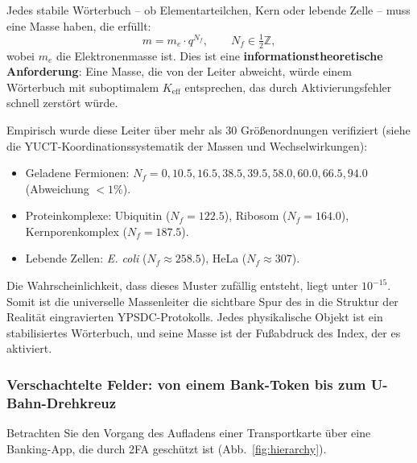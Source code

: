 \documentclass[12pt,a4paper]{article}
\theoremstyle{remark}
\begin{document}
	Jedes stabile Wörterbuch – ob Elementarteilchen, Kern oder lebende Zelle – muss eine Masse haben, die erfüllt:
	\[
	m = m_e \cdot q^{N_f}, \qquad N_f \in \tfrac{1}{2}\mathbb{Z},
	\]
	wobei \(m_e\) die Elektronenmasse ist. Dies ist eine \textbf{informationstheoretische Anforderung}: Eine Masse, die von der Leiter abweicht, würde einem Wörterbuch mit suboptimalem \(K_{\mathrm{eff}}\) entsprechen, das durch Aktivierungsfehler schnell zerstört würde.
	
	Empirisch wurde diese Leiter über mehr als 30 Größenordnungen verifiziert (siehe die YUCT-Koordinationssystematik der Massen und Wechselwirkungen):
	\begin{itemize}
		\item Geladene Fermionen: \(N_f = 0, 10.5, 16.5, 38.5, 39.5, 58.0, 60.0, 66.5, 94.0\) (Abweichung \(< 1\%\)).
		\item Proteinkomplexe: Ubiquitin (\(N_f = 122.5\)), Ribosom (\(N_f = 164.0\)), Kernporenkomplex (\(N_f = 187.5\)).
		\item Lebende Zellen: \textit{E. coli} (\(N_f \approx 258.5\)), HeLa (\(N_f \approx 307\)).
	\end{itemize}
	
	Die Wahrscheinlichkeit, dass dieses Muster zufällig entsteht, liegt unter \(10^{-15}\). Somit ist die universelle Massenleiter die sichtbare Spur des in die Struktur der Realität eingravierten YPSDC-Protokolls. Jedes physikalische Objekt ist ein stabilisiertes Wörterbuch, und seine Masse ist der Fußabdruck des Index, der es aktiviert.
	
	\subsubsection{Verschachtelte Felder: von einem Bank-Token bis zum U-Bahn-Drehkreuz}
	
	Betrachten Sie den Vorgang des Aufladens einer Transportkarte über eine Banking-App, die durch 2FA geschützt ist (Abb.~\ref{fig:hierarchy}).
	
\end{document}
